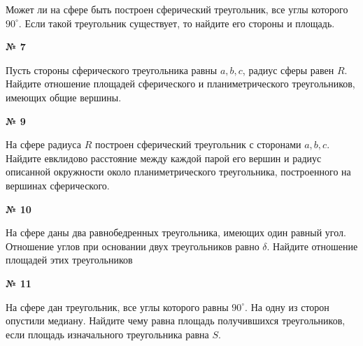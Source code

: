     Может ли на сфере быть построен сферический треугольник, все углы которого $90^\circ$.
    Если такой треугольник существует, то найдите его стороны и площадь.

    \begin{center}
        \textbf{№ 7}
    \end{center}

    Пусть стороны сферического треугольника равны $a, b, c$, радиус сферы равен $R$.
    Найдите отношение площадей сферического и планиметрического треугольников, имеющих общие вершины.

    \begin{center}
        \textbf{№ 9}
    \end{center}

    На сфере радиуса $R$ построен сферический треугольник с сторонами $a, b, c$.
    Найдите евклидово расстояние между каждой парой его вершин и радиус описанной окружности
    около планиметрического треугольника, построенного на вершинах сферического.

    \begin{center}
        \textbf{№ 10}
    \end{center}

    На сфере даны два равнобедренных треугольника, имеющих один равный угол.
    Отношение углов при основании двух треугольников равно $\delta$.
    Найдите отношение площадей этих треугольников

    \begin{center}
        \textbf{№ 11}
    \end{center}

    На сфере дан треугольник, все углы которого равны $90^\circ$.
    На одну из сторон опустили медиану.
    Найдите чему равна площадь получившихся треугольников, если площадь изначального треугольника равна $S$.


